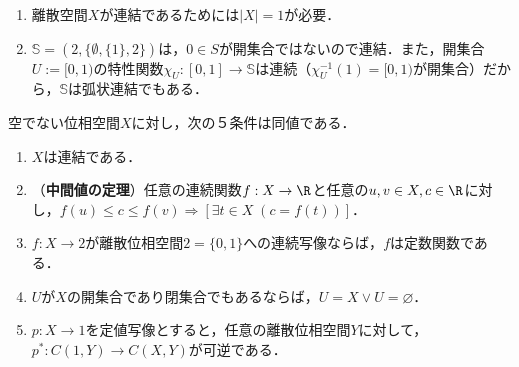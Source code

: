 \documentclass[uplatex,dvipdfmx]{jsreport}
\begin{document}
\begin{example}\mbox{}
    \begin{enumerate}
        \item 離散空間$X$が連結であるためには$|X|=1$が必要．
        \item $\mathbb{S}=(2,\{\emptyset,\{1\},2\})$は，$0\in S$が開集合ではないので連結．また，開集合$U:=[0,1)$の特性関数$\chi_U:[0,1]\to\mathbb{S}$は連続（$\chi_U^{-1}(1)=[0,1)$が開集合）だから，$\mathbb{S}$は弧状連結でもある．
    \end{enumerate}
\end{example}

\begin{proposition}\label{prop-charactorization-of-connectedness}
    空でない位相空間$X$に対し，次の５条件は同値である．
    \begin{enumerate}
        \item $X$は連結である．
        \item （\textbf{中間値の定理}）任意の連続関数$f:X\to\R$と任意の$u,v\in X, c\in\R$に対し，$f(u)\le c\le f(v)\Rightarrow[\exists t\in X\;(c=f(t))]$．
        \item $f:X\to 2$が離散位相空間$2=\{0,1\}$への連続写像ならば，$f$は定数関数である．
        \item $U$が$X$の開集合であり閉集合でもあるならば，$U=X\lor U=\varnothing$．
        \item $p:X\to 1$を定値写像とすると，任意の離散位相空間$Y$に対して，$p^*:C(1,Y)\to C(X,Y)$が可逆である．
    \end{enumerate}
\end{proposition}
\end{document}
